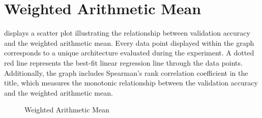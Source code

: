 \section{Weighted Arithmetic Mean}

 displays a scatter plot illustrating the relationship between validation accuracy and the weighted arithmetic mean. Every data point displayed within the graph corresponds to a unique architecture evaluated during the experiment. A dotted red line represents the best-fit linear regression line through the data points. Additionally, the graph includes Spearman's rank correlation coefficient in the title, which measures the monotonic relationship between the validation accuracy and the weighted arithmetic mean. 

\begin{figure}[h!]
  \centering
  
  \caption{Weighted Arithmetic Mean}
  \label{fig:weighted}
\end{figure}